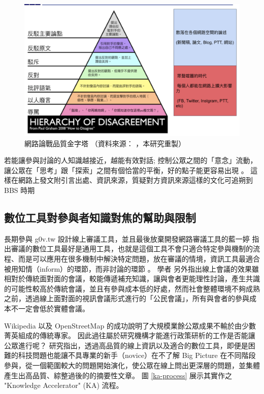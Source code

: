 \documentclass[12pt,a4paper]{article}
\begin{document}
\begin{figure}[htbp]
\centering
\includegraphics[width=.9\linewidth]{./images/how-to-disagree.png}
\caption{\label{fig:how-to-disagree}
網路論戰品質金字塔 （資料來源： \cite{zhu_2015} ，本研究重製）}
\end{figure}

若能讓參與討論的人知識越接近，越能有效對話; 控制公眾之間的「意念」流動，讓公眾在「思考」跟「探索」之間有個恰當的平衡，好的點子能更容易出現 \citep*{pentland14_shu}。 這樣在網路上發文附引言出處、資訊來源，質疑對方資訊來源這樣的文化可追朔到 BBS 時期 \citep*{malaita15}

\subsection{數位工具對參與者知識對焦的幫助與限制}
\label{sec:orgcfb3efe}
長期參與 g0v.tw 設計線上審議工具，並且最後放棄開發網路審議工具的藍一婷
指出審議的數位工具最好是通用工具，也就是這個工具不會只適合特定參與機制的流程、而是可以應用在很多機制中解決特定問題，放在審議的情境，資訊工具最適合被用知情（inform）的環節，而非討論的環節 \citep{etblue18,etblue2017}。 學者 \citep*{chen08} 另外指出線上會議的效果雖相對於傳統面對面的會議，較能傳遞補充知識，讓與會者更能理性討論，產生共識的可能性較高於傳統會議，並且有參與成本低的好處，然而社會整體環境不夠成熟之前，透過線上面對面的視訊會議形式進行的「公民會議」，所有與會者的參與成本不一定會低於實體會議。

Wikipedia 以及 OpenStreetMap 的成功說明了大規模業餘公眾成果不輸於由少數菁英組成的傳統專家。
因此過往屬於研究機構才能進行政策研析的工作是否能讓公眾進行呢？ \citep*{hahn16} 研究指出，透過高品質的線上資訊以及適合的數位工具，即便是困難的科技問題也能讓不具專業的新手（novice）在不了解 Big Picture 在不同階段參與，從一個範圍較大的問題開始演化，使公眾在線上問出更深層的問題，並集體產生出高品質、綜整過後的的摘要性文章。 圖 \ref{ka-process} 展示其實作之 "Knowledge Accelerator" (KA) 流程。
\end{document}
